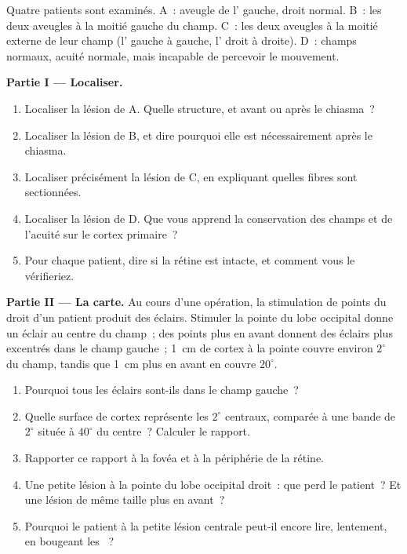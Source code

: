 \begin{problem}
\label{pb:g11:vision-and-brain:1}
Quatre patients sont examinés. A~: aveugle de l' gauche,  droit
normal. B~: les deux  aveugles à la moitié gauche du champ. C~: les
deux  aveugles à la moitié externe de leur champ (l' gauche à
gauche, l' droit à droite). D~: champs normaux, acuité normale, mais
incapable de percevoir le mouvement.

\medskip
\noindent\textbf{Partie I --- Localiser.}
\begin{enumerate}
  \item Localiser la lésion de A. Quelle structure, et avant ou après
        le chiasma~?
  \item Localiser la lésion de B, et dire pourquoi elle est
        nécessairement après le chiasma.
  \item Localiser précisément la lésion de C, en expliquant quelles
        fibres sont sectionnées.
  \item Localiser la lésion de D. Que vous apprend la conservation des
        champs et de l'acuité sur le cortex primaire~?
  \item Pour chaque patient, dire si la rétine est intacte, et comment
        vous le vérifieriez.
\end{enumerate}

\medskip
\noindent\textbf{Partie II --- La carte.}
Au cours d'une opération, la stimulation de points du 
droit d'un patient produit des éclairs. Stimuler la pointe du lobe
occipital donne un éclair au centre du champ~; des points plus en avant
donnent des éclairs plus excentrés dans le champ gauche~; \qty{1}{cm}
de cortex à la pointe couvre environ $2^\circ$ du champ, tandis que
\qty{1}{cm} plus en avant en couvre $20^\circ$.
\begin{enumerate}[resume]
  \item Pourquoi tous les éclairs sont-ils dans le champ gauche~?
  \item Quelle surface de cortex représente les $2^\circ$ centraux,
        comparée à une bande de $2^\circ$ située à $40^\circ$ du
        centre~? Calculer le rapport.
  \item Rapporter ce rapport à la fovéa et à la périphérie de la
        rétine.
  \item Une petite lésion à la pointe du lobe occipital droit~: que
        perd le patient~? Et une lésion de même taille plus en avant~?
  \item Pourquoi le patient à la petite lésion centrale peut-il encore
        lire, lentement, en bougeant les ~?
\end{enumerate}


\end{problem}
